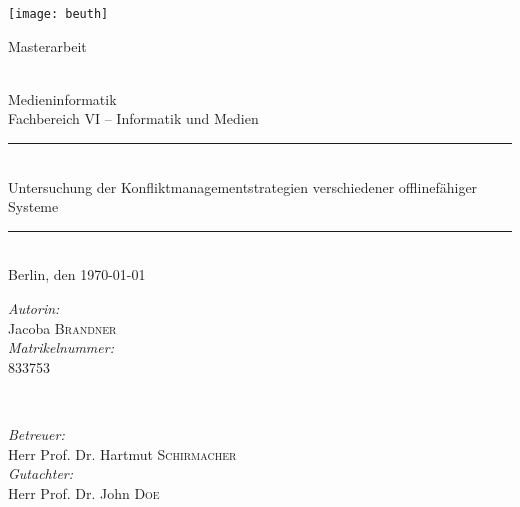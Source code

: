 \begin{titlepage}


\center %


\begin{center}
\texttt{[image: beuth]}  \\[2cm]
\end{center}

\begin{Large}
Masterarbeit
\end{Large}\\[0.4cm]
\LARGE{Medieninformatik}\\
\large{Fachbereich VI -- Informatik und Medien}\\[0.5cm]


\rule{\textwidth}{0.4pt}\\[1cm] %
{\LARGE Untersuchung der Konfliktmanagementstrategien verschiedener offlinefähiger Systeme}\\[\baselineskip]

\rule{\textwidth}{0.4pt}\\[1cm]%

{\Large Berlin, den \today{}} %
\vfill


\begin{minipage}{0.49\textwidth}
\begin{flushleft} \large
\emph{Autorin:}\\
Jacoba \textsc{Brandner} \\
\emph{Matrikelnummer:}\\
833753
\end{flushleft}
\end{minipage}
~
\begin{minipage}{0.49\textwidth}
\begin{flushright} \large
\emph{Betreuer:} \\
Herr Prof. Dr. Hartmut \textsc{Schirmacher} \\
\emph{Gutachter:} \\
Herr Prof. Dr. John \textsc{Doe} \\
\end{flushright}
\end{minipage}


\vfill %
\end{titlepage}
